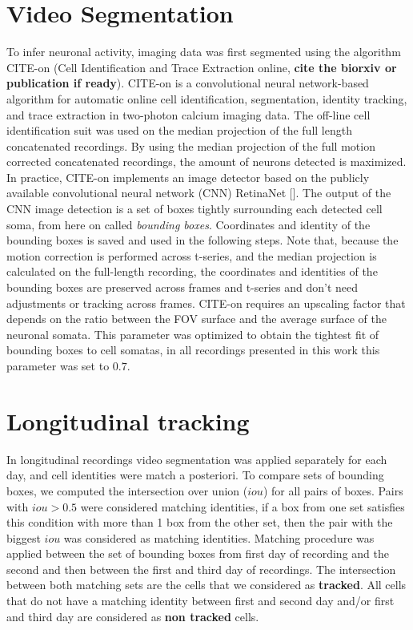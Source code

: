 \section{Video Segmentation}
\label{chap3:sec:4:segmentation}
To infer neuronal activity, imaging data was first segmented using the algorithm CITE-on (Cell Identification and Trace Extraction online, \textbf{cite the biorxiv or publication if ready}). 
CITE-on is a convolutional neural network-based algorithm for automatic online cell identification, segmentation, identity tracking, and trace extraction in two-photon calcium imaging data. 
The off-line cell identification suit was used on the median projection of the full length concatenated recordings.
By using the median projection of the full motion corrected concatenated recordings, the amount of neurons detected is maximized.
In practice, CITE-on implements an image detector based on the publicly available convolutional neural network (CNN) RetinaNet [\cite{lin2020}].
The output of the CNN image detection is a set of boxes tightly surrounding each detected cell soma, from here on called \textit{bounding boxes}.
Coordinates and identity of the bounding boxes is saved and used in the following steps. 
Note that, because the motion correction is performed across t-series, and the median projection is calculated on the full-length recording, the coordinates and identities of the bounding boxes are preserved across frames and t-series and don't need adjustments or tracking across frames. 
CITE-on requires an upscaling factor that depends on the ratio between the FOV surface and the average surface of the neuronal somata. 
This parameter was optimized to obtain the tightest fit of bounding boxes to cell somatas, in all recordings presented in this work this parameter was set to $0.7$.  

\section{Longitudinal tracking}
In longitudinal recordings video segmentation was applied separately for each day, and cell identities were match a posteriori. 
To compare sets of bounding boxes, we computed the intersection over union ($iou$) for all pairs of boxes. 
Pairs with $iou>0.5$ were considered matching identities, if a box from one set satisfies this condition with more than 1 box from the other set, then the pair with the biggest $iou$ was considered as matching identities. 
Matching procedure was applied between the set of bounding boxes from first day of recording and the second and then between the first and third day of recordings.
The intersection between both matching sets are the cells that we considered as \textbf{tracked}.
All cells that do not have a matching identity between first and second day and/or first and third day are considered as \textbf{non tracked} cells. 
